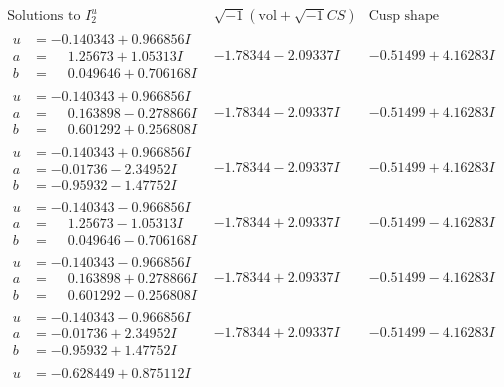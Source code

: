 \documentclass[1p]{elsarticle_modified}
\theoremstyle{definition}
\newcommand{\I}{\sqrt{-1}}
\begin{document}
$$\begin{array}{c|c|c}  
\text{Solutions to }I^u_{2}& \I (\text{vol} + \sqrt{-1}CS) & \text{Cusp shape}\\
 \hline 
\begin{aligned}
u &= -0.140343 + 0.966856 I \\
a &= \phantom{-}1.25673 + 1.05313 I \\
b &= \phantom{-}0.049646 + 0.706168 I\end{aligned}
 & -1.78344 - 2.09337 I & -0.51499 + 4.16283 I \\ \hline\begin{aligned}
u &= -0.140343 + 0.966856 I \\
a &= \phantom{-}0.163898 - 0.278866 I \\
b &= \phantom{-}0.601292 + 0.256808 I\end{aligned}
 & -1.78344 - 2.09337 I & -0.51499 + 4.16283 I \\ \hline\begin{aligned}
u &= -0.140343 + 0.966856 I \\
a &= -0.01736 - 2.34952 I \\
b &= -0.95932 - 1.47752 I\end{aligned}
 & -1.78344 - 2.09337 I & -0.51499 + 4.16283 I \\ \hline\begin{aligned}
u &= -0.140343 - 0.966856 I \\
a &= \phantom{-}1.25673 - 1.05313 I \\
b &= \phantom{-}0.049646 - 0.706168 I\end{aligned}
 & -1.78344 + 2.09337 I & -0.51499 - 4.16283 I \\ \hline\begin{aligned}
u &= -0.140343 - 0.966856 I \\
a &= \phantom{-}0.163898 + 0.278866 I \\
b &= \phantom{-}0.601292 - 0.256808 I\end{aligned}
 & -1.78344 + 2.09337 I & -0.51499 - 4.16283 I \\ \hline\begin{aligned}
u &= -0.140343 - 0.966856 I \\
a &= -0.01736 + 2.34952 I \\
b &= -0.95932 + 1.47752 I\end{aligned}
 & -1.78344 + 2.09337 I & -0.51499 - 4.16283 I \\ \hline\begin{aligned}
u &= -0.628449 + 0.875112 I \\

\end{aligned}
\end{array}$$
\end{document}
